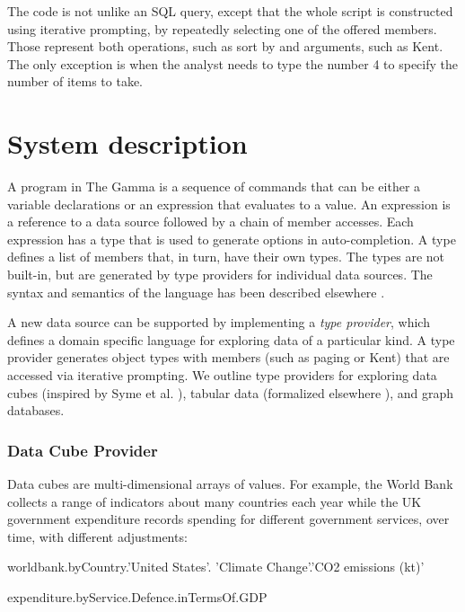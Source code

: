 \documentclass[conference]{IEEEtran}
\newcommand{\ikvd}[1]{{\fontfamily{zi4}\selectfont\small #1}}
\begin{document}
The code is not unlike an SQL query, except that the whole script is constructed using
iterative prompting, by repeatedly selecting one of the offered members. Those represent both
operations, such as \ikvd{sort by} and arguments, such as \ikvd{Kent}. The only exception
is when the analyst needs to type the number \ikvd{4} to specify the number of items to take.

\section{System description}
\label{sec:system}

\noindent
A program in The Gamma is a sequence of commands that can be either a variable declarations or
an expression that evaluates to a value. An expression is a reference to a data source followed
by a chain of member accesses. Each expression has a type that is used to generate options in
auto-completion. A type defines a list of members that, in turn, have their own types.
The types are not built-in, but are generated by type providers for individual data sources.
The syntax and semantics of the language has been described elsewhere \cite{tglive}.

A new data source can be supported by implementing a \emph{type provider},
which defines a domain specific language for exploring data of a particular kind.
A type provider generates object types with members (such as \ikvd{paging} or \ikvd{Kent})
that are accessed via iterative prompting. We outline type providers for exploring data cubes
(inspired by Syme et al. \cite{inforich}), tabular data (formalized elsewhere \cite{dotdriven}), and graph databases.

\vspace{0.5em}
\subsubsection*{Data Cube Provider}
Data cubes are multi-dimensional arrays of values. For example, the World Bank collects a range of
indicators about many countries each year while the UK government expenditure records spending for
different government services, over time, with different adjustments:

\vspace{0.25em}
\begin{thegamma}
worldbank.byCountry.'United States'.
  'Climate Change'.'CO2 emissions (kt)'

expenditure.byService.Defence.inTermsOf.GDP
\end{thegamma}
\vspace{0.25em}
\end{document}

